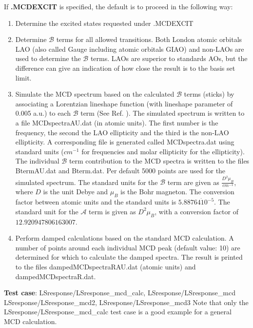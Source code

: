 If {\bf .MCDEXCIT} is specified, the default is to proceed in the following way: 
\begin{enumerate}
\item Determine the excited states requested under .MCDEXCIT 
\item Determine $\mathcal{B}$ terms for all allowed transitions. Both London atomic orbitals LAO (also called Gauge including atomic orbitals GIAO) and non-LAOs are used to determine the $\mathcal{B}$ terms. LAOs are superior to standards AOs, but the difference can give an indication of how close the result is to the basis set limit. 
\item Simulate the MCD spectrum based on the calculated $\mathcal{B}$ terms 
(sticks) by associating a Lorentzian lineshape function (with lineshape parameter of 0.005 a.u.) to each $\mathcal{B}$ term (See Ref. \cite{KjaergaardMCD}). 
The simulated spectrum is written to a file MCDspectraAU.dat (in atomic units). The first number is the frequency, the second the LAO ellipticity and the third is the non-LAO ellipticity. A corresponding file is generated called MCDspectra.dat using standard units ($cm^{-1}$ for frequencies and molar ellipticity for the ellipticity).
The individual $\mathcal{B}$ term contribution to the MCD spectra is written to the files BtermAU.dat and Bterm.dat. Per default 5000 points are used for the simulated spectrum. 
The standard units for the $\mathcal{B}$ term are given as $\frac{D^{2} \mu_{B}}{cm^{-1}}$, where $D$ is the unit Debye and $\mu_{B}$ is the Bohr magneton. The conversion factor between atomic units and the standard units is $5.88764 \dot 10^{-5}$.
The standard unit  for the $\mathcal{A}$ term is given as $D^{2} \mu_{B}$, with a conversion factor of $12.920947806163007$.

\item Perform damped calculations based on the standard MCD calculation. A number of points around each individual MCD peak (default value: 10) are determined for which to calculate the damped spectra. The result is printed to the files dampedMCDspectraRAU.dat (atomic units) and dampedMCDspectraR.dat.
\end{enumerate}
{\bf Test case}: LSresponse/LSresponse\_mcd\_calc, LSresponse/LSresponse\_mcd\newline
LSresponse/LSresponse\_mcd2, LSresponse/LSresponse\_mcd3  \newline
Note that only the LSresponse/LSresponse\_mcd\_calc test case is a good example for a general MCD calculation.

